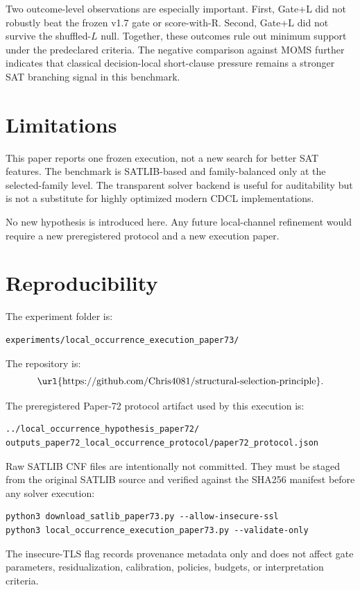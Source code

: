 \documentclass[11pt,a4paper]{article}
\begin{document}
Two outcome-level observations are especially important. First, Gate+L did not
robustly beat the frozen v1.7 gate or score-with-R. Second, Gate+L did not
survive the shuffled-$L$ null. Together, these outcomes rule out minimum support
under the predeclared criteria. The negative comparison against MOMS further
indicates that classical decision-local short-clause pressure remains a stronger
SAT branching signal in this benchmark.

\section{Limitations}

This paper reports one frozen execution, not a new search for better SAT
features. The benchmark is SATLIB-based and family-balanced only at the
selected-family level. The transparent solver backend is useful for auditability
but is not a substitute for highly optimized modern CDCL implementations.

No new hypothesis is introduced here. Any future local-channel refinement would
require a new preregistered protocol and a new execution paper.

\section{Reproducibility}

The experiment folder is:
\begin{verbatim}
experiments/local_occurrence_execution_paper73/
\end{verbatim}

The repository is:
\[
\text{\url{https://github.com/Chris4081/structural-selection-principle}}.
\]

The preregistered Paper-72 protocol artifact used by this execution is:
\begin{verbatim}
../local_occurrence_hypothesis_paper72/
outputs_paper72_local_occurrence_protocol/paper72_protocol.json
\end{verbatim}

Raw SATLIB CNF files are intentionally not committed. They must be staged from
the original SATLIB source and verified against the SHA256 manifest before any
solver execution:
\begin{verbatim}
python3 download_satlib_paper73.py --allow-insecure-ssl
python3 local_occurrence_execution_paper73.py --validate-only
\end{verbatim}
The insecure-TLS flag records provenance metadata only and does not affect
gate parameters, residualization, calibration, policies, budgets, or
interpretation criteria.
\end{document}
